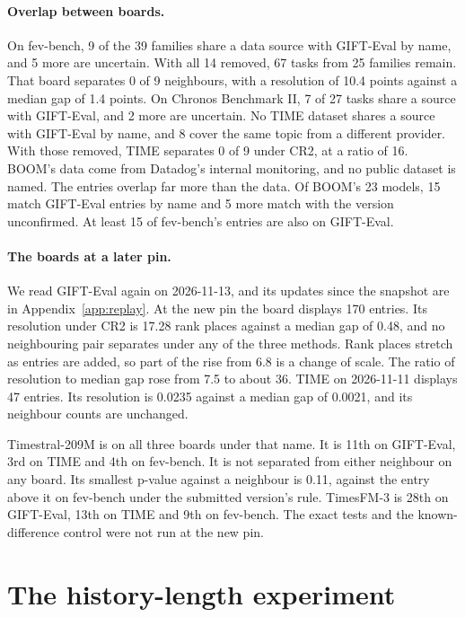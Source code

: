 \documentclass{article}
\begin{document}
\paragraph{Overlap between boards.} On fev-bench, 9 of the 39 families share a data source with
GIFT-Eval by name, and 5 more are uncertain. With all 14 removed, 67 tasks from 25 families
remain. That board separates 0 of 9 neighbours, with a resolution of 10.4 points against a
median gap of 1.4 points. On Chronos Benchmark II, 7 of 27 tasks share a source with GIFT-Eval,
and 2 more are uncertain. No TIME dataset shares a source with GIFT-Eval by name, and 8 cover
the same topic from a different provider. With those removed, TIME separates 0 of 9 under CR2,
at a ratio of 16. BOOM's data come from Datadog's internal monitoring, and no public dataset is
named. The entries overlap far more than the data. Of BOOM's 23 models, 15 match GIFT-Eval
entries by name and 5 more match with the version unconfirmed. At least 15 of fev-bench's
entries are also on GIFT-Eval.

\paragraph{The boards at a later pin.} We read GIFT-Eval again on 2026-11-13, and its updates since the snapshot are in Appendix~\ref{app:replay}.
At the new pin the board displays 170 entries. Its resolution under CR2 is 17.28 rank
places against a median gap of 0.48, and no neighbouring pair separates under any of the three
methods. Rank places stretch as entries are added, so part of the rise from 6.8 is a change of
scale. The ratio of resolution to median gap rose from 7.5 to about 36. TIME on 2026-11-11
displays 47 entries. Its resolution is 0.0235 against a median gap of 0.0021, and its
neighbour counts are unchanged.

Timestral-209M is on all three boards under that name. It is 11th on GIFT-Eval, 3rd on TIME and
4th on fev-bench. It is not separated from either neighbour on any board. Its smallest p-value
against a neighbour is 0.11, against the entry above it on fev-bench under the submitted
version's rule. TimesFM-3 is 28th on GIFT-Eval, 13th on TIME and 9th on fev-bench. The exact
tests and the known-difference control were not run at the new pin.


\section{The history-length experiment}
\label{app:history}
\end{document}
